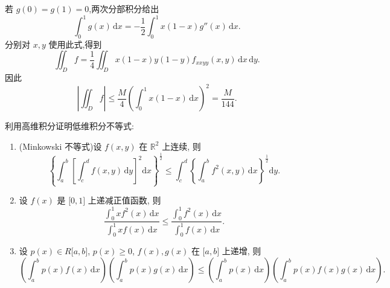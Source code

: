 \begin{solution}
    若 $g(0)=g(1)=0$,两次分部积分给出
    \[
        \displaystyle\int_0^1g(x)\,\mathrm{d}x=-\dfrac{1}{2}\int_0^1x(1-x)g''(x)\,\mathrm{d}x.
    \]
    分别对 $x,y$ 使用此式,得到
    \[
        \displaystyle\iint_Df=\dfrac{1}{4}\iint_Dx(1-x)y(1-y)f_{xxyy}(x,y)\,\mathrm{d}x\,\mathrm{d}y.
    \]
    因此
    \[
        \left|\iint_Df\right|\leq\dfrac{M}{4}\left(\int_0^1x(1-x)\,\mathrm{d}x\right)^2
        =\dfrac{M}{144}.
    \]
\end{solution}

\begin{example}[\markstar]
    利用高维积分证明低维积分不等式:
    \begin{enumerate}
        \item (Minkowski 不等式)设 $f(x,y)$ 在 $\mathbb{R}^2$ 上连续, 则
              \[
                  \left\{\int_a^b\left[\int_c^d f(x,y)\,\mathrm{d}y\right]^2\mathrm{d}x\right\}^{\frac{1}{2}}
                  \leq
                  \int_c^d\left\{\int_a^b f^2(x,y)\,\mathrm{d}x\right\}^{\frac{1}{2}}\mathrm{d}y.
              \]
        \item 设 $f(x)$ 是 $\lbrack0,1\rbrack$ 上递减正值函数, 则
              \[
                  \dfrac{\displaystyle\int_0^1x f^2(x)\,\mathrm{d}x}
                  {\displaystyle\int_0^1x f(x)\,\mathrm{d}x}
                  \leq
                  \dfrac{\displaystyle\int_0^1 f^2(x)\,\mathrm{d}x}
                  {\displaystyle\int_0^1 f(x)\,\mathrm{d}x}.
              \]
        \item 设 $p(x)\in R\lbrack a,b\rbrack$, $p(x)\geq0$, $f(x),g(x)$ 在 $\lbrack a,b\rbrack$ 上递增, 则
              \[
                  \left(\int_a^bp(x)f(x)\,\mathrm{d}x\right)
                  \left(\int_a^bp(x)g(x)\,\mathrm{d}x\right)
                  \leq
                  \left(\int_a^bp(x)\,\mathrm{d}x\right)
                  \left(\int_a^bp(x)f(x)g(x)\,\mathrm{d}x\right).
              \]
    \end{enumerate}
\end{example}
\exampleblank

